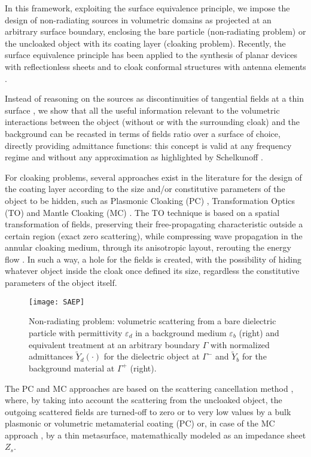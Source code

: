 \documentclass[reprint, showpacs, amsmath,amssymb, aps,
prb]{revtex4-1}
\begin{document}
In this framework, exploiting the surface equivalence principle, we impose the design of non-radiating sources in volumetric domains as projected at an arbitrary surface boundary, enclosing the bare particle (non-radiating problem) or the uncloaked object with its coating layer (cloaking problem).  Recently, the surface equivalence principle has been applied to the synthesis of planar devices with reflectionless sheets \cite{Grbic} and to cloak conformal structures with antenna elements \cite{Eleft}. 

Instead of reasoning on the sources as discontinuities of tangential fields at a thin surface \cite{Schelkunoff_1}, we  show that all the useful information relevant to the volumetric interactions between the object (without or with the surrounding cloak) and the background can be recasted in terms of fields ratio over a surface of choice, directly providing admittance functions: this concept is valid at any frequency regime and without any approximation as highlighted by Schelkunoff  \cite{Imp_Gen}. 

For cloaking problems, several approaches exist in the literature for the design of the coating layer according to the size and/or constitutive parameters of the object to be hidden, such as  Plasmonic Cloaking (PC) \cite{PC}, Transformation Optics (TO) \cite{TO1,TO2} and Mantle Cloaking (MC) \cite{MC,Patt_Meta,Fost_Meta}. The TO technique is based on a spatial transformation of fields, preserving their free-propagating characteristic outside a certain region (exact zero scattering), while compressing wave propagation in the annular cloaking medium, through its anisotropic layout, rerouting the energy flow \cite{TO1,TO2}. In such a way, a hole for the fields is created, with the possibility of hiding whatever object inside the cloak once defined its size, regardless the constitutive parameters of the object itself. 
%
\begin{figure}[h!]
\centering
\texttt{[image: SAEP]}
\caption{\small Non-radiating problem: volumetric scattering from a bare dielectric particle with permittivity $\varepsilon_d$ in a background medium $\varepsilon_b$ (right) and equivalent treatment at an arbitrary boundary $\Gamma$ with normalized admittances $\widetilde{Y}_d(\cdot)$ for the dielectric object at $\Gamma^-$ and $\widetilde{Y}_b$ for the background material at $\Gamma^+$ (right).}
\label{fig:nonrad}
\end{figure}
%

The PC and MC approaches are based on the scattering cancellation method \cite{PC,MC}, where, by taking into account the scattering from the uncloaked object, the outgoing scattered fields are turned-off to zero or to very low values by a bulk plasmonic or volumetric metamaterial coating (PC)\cite{PC} or, in case of the MC approach \cite{MC}, by  a thin  metasurface, matemathically modeled as an impedance sheet $Z_s$. 
\end{document}

